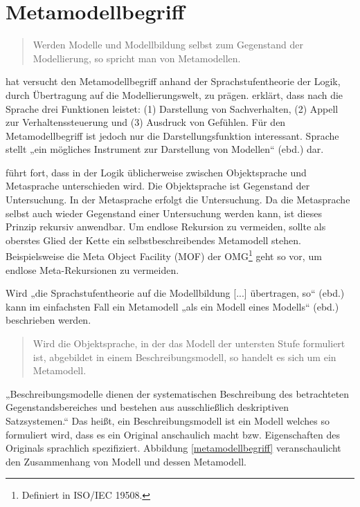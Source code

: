  
\section{Metamodellbegriff}\label{}
 
\begin{quote}
 Werden Modelle und Modellbildung selbst zum Gegenstand der Modellierung, so spricht man von Metamodellen. \citep[S.~1]{Strahringer}
\end{quote}
 
\citep{Strahringer} hat versucht den Metamodellbegriff anhand der Sprachstufentheorie der Logik, durch Übertragung auf die Modellierungswelt, zu prägen. \citep[S.~1]{Strahringer} erklärt, dass nach \citep{Buehler} die Sprache drei Funktionen leistet: (1) Darstellung von Sachverhalten, (2) Appell zur Verhaltenssteuerung und (3) Ausdruck von Gefühlen. Für den Metamodellbegriff ist jedoch nur die Darstellungsfunktion interessant. Sprache stellt „ein mögliches Instrument zur Darstellung von Modellen“ (ebd.) dar.

 
\citep[S.~1]{Strahringer} führt fort, dass in der Logik üblicherweise zwischen Objektsprache und Metasprache unterschieden wird. Die Objektsprache ist Gegenstand der Untersuchung. In der Metasprache erfolgt die Untersuchung. Da die Metasprache selbst auch wieder Gegenstand einer Untersuchung werden kann, ist dieses Prinzip rekursiv anwendbar. Um endlose Rekursion zu vermeiden, sollte als oberstes Glied der Kette ein selbstbeschreibendes Metamodell stehen. Beispielsweise die Meta Object Facility (MOF) der OMG\footnote{Definiert in ISO/IEC 19508.} geht so vor, um endlose Meta-Rekursionen zu vermeiden.

 
Wird „die Sprachstufentheorie auf die Modellbildung [...] übertragen, so“ (ebd.) kann im einfachsten Fall ein Metamodell „als ein Modell eines Modells“ (ebd.) beschrieben werden.

 
\begin{quote}
 Wird die Objektsprache, in der das Modell der untersten Stufe formuliert ist, abgebildet in einem Beschreibungsmodell, so handelt es sich um ein Metamodell. \citep[S.~3]{Strahringer}
\end{quote}
 
„Beschreibungsmodelle dienen der systematischen Beschreibung des betrachteten Gegenstandsbereiches und bestehen aus ausschließlich deskriptiven Satzsystemen.“ Das heißt, ein Beschreibungsmodell ist ein Modell welches so formuliert wird, dass es ein Original anschaulich macht bzw. Eigenschaften des Originals sprachlich spezifiziert. Abbildung \ref{metamodellbegriff} veranschaulicht den Zusammenhang von Modell und dessen Metamodell.

